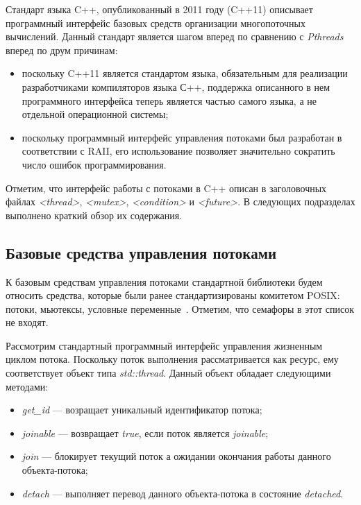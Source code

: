 Стандарт языка C++, опубликованный в 2011 году (C++11) описывает
программный интерфейс базовых средств организации многопоточных вычислений.
Данный стандарт является шагом вперед по сравнению с \textit{Pthreads}
вперед по друм причинам:
\begin{itemize}
  \item поскольку C++11 является стандартом языка,
    обязательным для реализации разработчиками компиляторов языка С++,
    поддержка описанного в нем программного интерфейса теперь является
    частью самого языка, а не отдельной операционной системы;
  \item поскольку программный интерфейс управления потоками был
    разработан в соответствии с RAII, его использование позволяет
    значительно сократить число ошибок программирования.
\end{itemize}

Отметим, что интерфейс работы с потоками в C++ описан в
заголовочных файлах \textit{<thread>}, \textit{<mutex>},
\textit{<condition>} и \textit{<future>}.
В следующих подразделах выполнено краткий обзор их содержания.

\subsection{Базовые средства управления потоками}

К базовым средствам управления потоками стандартной библиотеки
будем относить средства, которые были ранее стандартизированы комитетом POSIX:
потоки, мьютексы, условные переменные~\cite{cppreference_thread}.
Отметим, что семафоры в этот список не входят.

Рассмотрим стандартный программный интерфейс управления жизненным циклом потока.
Поскольку поток выполнения рассматривается как ресурс, ему соответствует
объект типа \textit{std::thread}. Данный объект обладает следующими методами:
\begin{itemize}
\item \textit{get\_id} --- возращает уникальный идентификатор потока;
\item \textit{joinable} --- возвращает \textit{true}, если поток является
  \textit{joinable};
\item \textit{join} --- блокирует текущий поток а ожидании окончания работы
  данного объекта-потока;
\item \textit{detach} --- выполняет перевод данного объекта-потока в состояние
  \textit{detached}.
\end{itemize}

